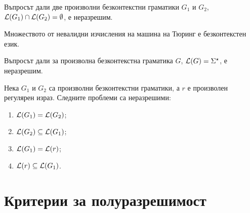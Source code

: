 \begin{thm}
  Въпросът дали две произволни безконтекстни граматики $G_1$ и $G_2$, $\mathcal{L}(G_1) \cap \mathcal{L}(G_2) = \emptyset$,
  е неразрешим.
\end{thm}

\begin{lemma}
  Множеството от невалидни изчисления на машина на Тюринг е безконтекстен език.
\end{lemma}

\begin{thm}
  Въпросът дали за произволна безконтекстна граматика $G$, $\mathcal{L}(G) = \Sigma^\star$,
  е неразрешим.
\end{thm}

\begin{cor}
  Нека $G_1$ и $G_2$ са произволни безконтекстни граматики, а $r$ е произволен регулярен израз.
  Следните проблеми са неразрешими:
  \begin{enumerate}
  \item 
    $\mathcal{L}(G_1) = \mathcal{L}(G_2)$;
  \item
    $\mathcal{L}(G_2) \subseteq \mathcal{L}(G_1)$;
  \item
    $\mathcal{L}(G_1) = \mathcal{L}(r)$;
  \item
    $\mathcal{L}(r) \subseteq \mathcal{L}(G_1)$.
  \end{enumerate}
\end{cor}

\section{Критерии за полуразрешимост}

